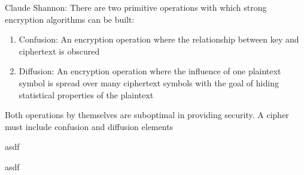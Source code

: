 \documentclass[landscape, a4paper]{article}
\begin{document}
\begin{minipage}[t]{0.19\pagewidth}
\begin{betterlist}
\begin{betterlist}
			\begin{betterlist}
				\item \alert{Claude Shannon:} There are two primitive operations with which strong encryption algorithms can be built:
				\begin{enumerate}
					\item \alert{Confusion:} An encryption operation where the \alert{relationship between key and ciphertext is obscured}
					\item \alert{Diffusion:} An encryption operation where the \alert{influence of one plaintext symbol is spread over many ciphertext symbols} with the goal of hiding statistical properties of the plaintext
				\end{enumerate}
				\begin{betterlist}
					\item Both operations by themselves are suboptimal in providing security. A cipher must include confusion and diffusion elements
				\end{betterlist}
			\end{betterlist}
		\end{betterlist}
	\end{betterlist}
\end{minipage}
\begin{minipage}[t]{0.19\pagewidth}
	\begin{betterlist}
		\item asdf
	\end{betterlist}
\end{minipage}
\begin{minipage}[t]{0.19\pagewidth}
	\begin{betterlist}
		\item asdf
	\end{betterlist}
\end{minipage}
\end{document}
